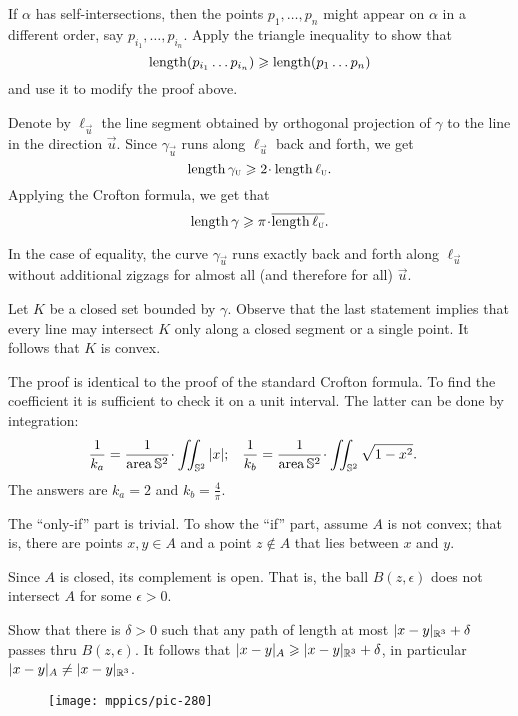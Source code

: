 If $\alpha$ has self-intersections, then the points $p_1,\dots, p_n$ might appear on $\alpha$ in a different order, say $p_{i_1},\dots,p_{i_n}$.
Apply the triangle inequality to show that 
\[\mathop{\rm length}\nolimits(p_{i_1}\dots p_{i_n})\geqslant \mathop{\rm length}\nolimits (p_1\dots p_n)\]
and use it to modify the proof above.

Denote by $\ell_{\vec u}$ the line segment 
obtained by orthogonal projection of $\gamma$ to the line in the direction ${\vec u}$.
Since $\gamma_{\vec u}$ runs along $\ell_{\vec u}$ back and forth, we get 
\[\length\gamma_{\vec u}\ge 2\cdot\length\ell_{\vec u}.\]
Applying the Crofton formula, we get that 
\[\length\gamma\ge \pi\cdot \overline{\length\ell_{\vec u}}.\]

In the case of equality, the curve $\gamma_{\vec u}$ runs exactly back and forth along $\ell_{\vec u}$ without additional zigzags for almost all (and therefore for all) ${\vec u}$.

Let $K$ be a closed set bounded by $\gamma$.
Observe that the last statement implies that every line may intersect $K$ only along a closed segment or a single point.
It follows that $K$ is convex.

The proof is identical to the proof of the standard Crofton formula.
To find the coefficient it is sufficient to check it on a unit interval.
The latter can be done by integration:
\begin{align*}
\frac1{k_a}&=\frac{1}{\area \mathbb{S}^2}\cdot\iint_{\mathbb{S}^2} |x|;
&
\frac1{k_b}&=\frac{1}{\area \mathbb{S}^2}\cdot\iint_{\mathbb{S}^2} \sqrt{1-x^2}.
\end{align*}
The answers are $k_a=2$ and $k_b=\tfrac4\pi$.

The ``only-if'' part is trivial.
To show the ``if'' part, assume $A$ is not convex;
that is, there are points $x,y\in A$ and a point $z\notin A$ that lies between $x$ and $y$.

Since $A$ is closed, its complement is open.
That is, the ball $B(z,\epsilon)$ does not intersect $A$ for some $\epsilon>0$.

Show that there is $\delta>0$ such that any path of length at most $\dist{x}{y}{\mathbb{R}^3}+\delta$ passes thru $B(z,\epsilon)$.
It follows that $\dist{x}{y}A\ge \dist{x}{y}{\mathbb{R}^3}+\delta$, 
in particular $\dist{x}{y}A\ne \dist{x}{y}{\mathbb{R}^3}$.

\begin{wrapfigure}{r}{30 mm}
\vskip-4mm
\centering
\texttt{[image: mppics/pic-280]}
\vskip0mm
\end{wrapfigure}

